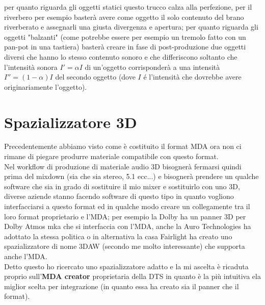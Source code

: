 \documentclass[12pt,a4paper]{report}
\begin{document}
per quanto riguarda gli oggetti statici questo trucco calza alla perfezione, per il riverbero per esempio basterà avere come oggetto il solo contenuto del brano riverberato e assegnarli una giusta divergenza e apertura; per quanto riguarda gli oggetti "balzanti" (come potrebbe essere per esempio un tremolo fatto con un pan-pot in una tastiera) basterà creare in fase di post-produzione due oggetti diversi che hanno lo stesso contenuto sonoro e che differiscono soltanto che l'intensità sonora $I'=\alpha I$ di un'oggetto corrisponderà a una intensità $I''=(1-\alpha) I$ del secondo oggetto (dove $I$ é l'intensità che dovrebbe avere originariamente l'oggetto).

\section{Spazializzatore 3D}

Precedentemente abbiamo visto come è costituito il format MDA ora non ci rimane di piegare produrre materiale compatibile con questo format.\\

Nel workflow di produzione di materiale audio 3D bisognerà fermarsi quindi prima del mixdown (sia che sia stereo, 5.1 ecc...) e bisognerà prendere un qualche software che sia in grado di sostituire il mio mixer e sostituirlo con uno 3D, diverse aziende stanno facendo software di questo tipo in quanto vogliono interfacciarsi a questo format ed in qualche modo creare un collegamente tra il loro format proprietario e l'MDA; per esempio la Dolby ha un panner 3D per Dolby Atmos mka che si interfaccia con l'MDA, anche la Auro Technologies ha adottato la stessa politica o in alternativa la casa Fairlight ha creato uno spazializzatore di nome 3DAW (secondo me molto interessante) che supporta anche l'MDA.\\

Detto questo ho ricercato uno spazializzatore adatto e la mi ascelta è ricaduta proprio sull'\textbf{MDA creator} proprietaria della DTS in quanto è la più intuitiva ela miglior scelta per integrazione (in quanto essa ha creato sia il panner che il format).
\end{document}
